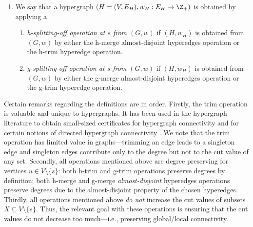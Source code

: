 \begin{definition}
\begin{enumerate}
\item We say that a hypergraph $(H=(V, E_H), w_H: E_H\rightarrow \Z_+)$ is obtained by applying a 
        \begin{enumerate}
            \item \emph{h-splitting-off operation at $s$ from $(G, w)$} if $(H, w_H)$ is obtained from $(G, w)$ by either the h-merge almost-disjoint hyperedges operation or the h-trim hyperedge operation. 
            \item \emph{g-splitting-off operation at $s$ from $(G, w)$} if $(H, w_H)$ is obtained from $(G, w)$ by either the g-merge almost-disjoint hyperedges operation or the g-trim hyperedge operation. 
        \end{enumerate}

\end{enumerate}
\end{definition}
Certain remarks regarding the definitions are in order. 
Firstly, the trim operation is valuable and unique to hypergraphs. It has been used in the hypergraph literature to obtain small-sized certificates for hypergraph connectivity \cite{CX18} and for certain notions of directed hypergraph connectivity \cite{Frank-book}. 
We note that the trim operation has limited value in graphs---trimming an edge leads to a singleton edge and singleton edges contribute only to the degree but not to the cut value of any set. 
Secondly, all operations mentioned above are degree preserving for vertices $u\in V\setminus \{s\}$: both h-trim and g-trim operations preserve degrees by definition; both h-merge and g-merge \emph{almost-disjoint} hyperedges operations preserve degrees due to the almost-disjoint property of the chosen hyperedges. 
Thirdly, all operations mentioned above 
\emph{do not} increase the %
cut values of subsets $X\subseteq V\setminus\{s\}$. Thus, the relevant goal with these operations is ensuring that the cut values do not decrease too much---i.e., preserving global/local connectivity. 
